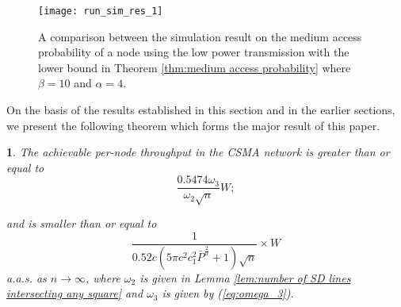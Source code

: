 \documentclass[english]{IEEEtran}
\theoremstyle{plain}
\newtheorem{thm}{\protect\theoremname}
\theoremstyle{plain}
\theoremstyle{plain}
\theoremstyle{remark}
\providecommand{\theoremname}{Theorem}
\begin{document}
\begin{figure}
\begin{centering}
\texttt{[image: run\_sim\_res\_1]}
\par\end{centering}

\protect\caption{\label{fig:medium access probability}A comparison between the simulation
result on the medium access probability of a node using the low power
transmission with the lower bound in Theorem \ref{thm:medium access probability}
where $\beta=10$ and $\alpha=4$. }
\end{figure}


On the basis of the results established in this section and in the
earlier sections, we present the following theorem which forms the
major result of this paper. 
\begin{thm}
\textbf{\label{thm:Throughput-lower-bound}}The achievable per-node
throughput in the CSMA network is greater than or equal to 
\begin{equation}
\frac{0.5474\omega_{3}}{\omega_{2}\sqrt{n}}W;\label{eq:pre-constant}
\end{equation}


and is smaller than or equal to 
\[
\frac{1}{0.52c\left(5\pi c^{2}c_{1}^{2}\bar{P}^{\frac{2}{\alpha}}+1\right)\sqrt{n}}\times W
\]
a.a.s. as $n\rightarrow\infty$, where $\omega_{2}$ is given in Lemma
\ref{lem:number of SD lines intersecting any square} and $\omega_{3}$
is given by (\ref{eq:omega_3}).\end{thm}
\end{document}
